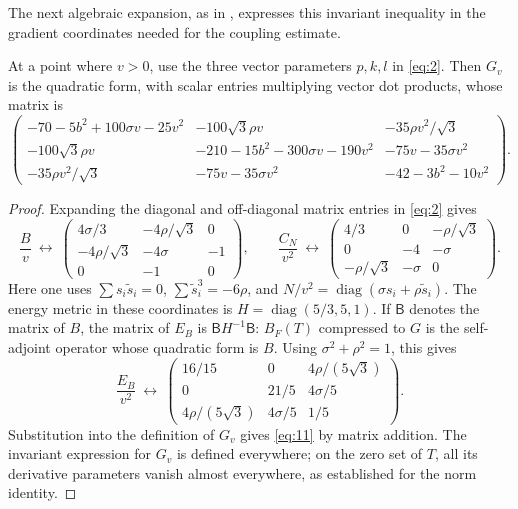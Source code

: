 The next algebraic expansion, as in \cite[Lemma~5.4]{OpenAI2026P},
expresses this invariant inequality in the gradient coordinates needed
for the coupling estimate.

\begin{lemma}
\label{lem:hessian-matrices}
At a point where \(v>0\), use the three vector parameters \(p,k,l\) in
\eqref{eq:2}.  Then \(G_v\) is the quadratic form, with scalar entries
multiplying vector dot products, whose matrix is
\begin{equation}
 \begin{pmatrix}
 -70-5b^2+100\sigma v-25v^2
   &-100\sqrt3\rho v&-35\rho v^2/\sqrt3\\
 -100\sqrt3\rho v
   &-210-15b^2-300\sigma v-190v^2&-75v-35\sigma v^2\\
 -35\rho v^2/\sqrt3
   &-75v-35\sigma v^2&-42-3b^2-10v^2
 \end{pmatrix}.
 \tag{11}\label{eq:11}
\end{equation}
\end{lemma}

\begin{proof}
Expanding the diagonal and off-diagonal matrix entries in \eqref{eq:2}
gives
\[
 \frac{B}{v}\ \longleftrightarrow\
 \begin{pmatrix}
 4\sigma/3&-4\rho/\sqrt3&0\\
 -4\rho/\sqrt3&-4\sigma&-1\\
 0&-1&0
 \end{pmatrix},
 \qquad
 \frac{C_N}{v^2}\ \longleftrightarrow\
 \begin{pmatrix}
 4/3&0&-\rho/\sqrt3\\
 0&-4&-\sigma\\
 -\rho/\sqrt3&-\sigma&0
 \end{pmatrix}.
\]
Here one uses
\(\sum s_i\widetilde s_i=0\),
\(\sum\widetilde s_i^3=-6\rho\), and
\(N/v^2=\operatorname{diag}(\sigma s_i+\rho\widetilde s_i)\).
The energy metric in these coordinates is
\(H=\operatorname{diag}(5/3,5,1)\).
If \(\mathsf B\) denotes the matrix of \(B\), the matrix of \(E_B\) is
\(\mathsf B H^{-1}\mathsf B\): \(B_F(T)\) compressed to
\(G\) is the self-adjoint operator whose quadratic form is
\(B\).  Using \(\sigma^2+\rho^2=1\), this gives
\[
 \frac{E_B}{v^2}\ \longleftrightarrow\
 \begin{pmatrix}
 16/15&0&4\rho/(5\sqrt3)\\
 0&21/5&4\sigma/5\\
 4\rho/(5\sqrt3)&4\sigma/5&1/5
 \end{pmatrix}.
\]
Substitution into the definition of \(G_v\) gives \eqref{eq:11} by
matrix addition.  The invariant expression for \(G_v\) is defined
everywhere; on the zero set of \(T\), all its derivative parameters
vanish almost everywhere, as established for the norm identity.
\end{proof}

